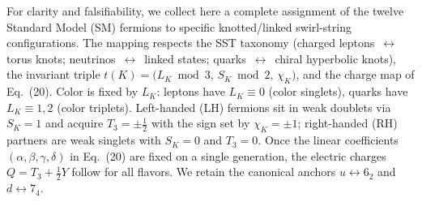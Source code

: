 \documentclass[11pt, preprint,titlepage]{revtex4-2}
\begin{document}
For clarity and falsifiability, we collect here a complete assignment of the twelve Standard Model (SM) fermions to specific knotted/linked swirl-string configurations. The mapping respects the SST taxonomy (charged leptons \,$\leftrightarrow$\, torus knots; neutrinos \,$\leftrightarrow$\, linked states; quarks \,$\leftrightarrow$\, chiral hyperbolic knots), the invariant triple
\(t(K) = \big(L_K \bmod 3,\, S_K \bmod 2,\, \chi_K\big)\), and the charge map of Eq.~(20). Color is fixed by \(L_K\): leptons have \(L_K\equiv 0\) (color singlets), quarks have \(L_K\equiv 1,2\) (color triplets). Left-handed (LH) fermions sit in weak doublets via \(S_K=1\) and acquire \(T_3=\pm\tfrac12\) with the sign set by \(\chi_K=\pm 1\); right-handed (RH) partners are weak singlets with \(S_K=0\) and \(T_3=0\). Once the linear coefficients \((\alpha,\beta,\gamma,\delta)\) in Eq.~(20) are fixed on a single generation, the electric charges \(Q = T_3 + \tfrac12 Y\) follow for all flavors. We retain the canonical anchors \(u\leftrightarrow 6_2\) and \(d\leftrightarrow 7_4\).
\end{document}

